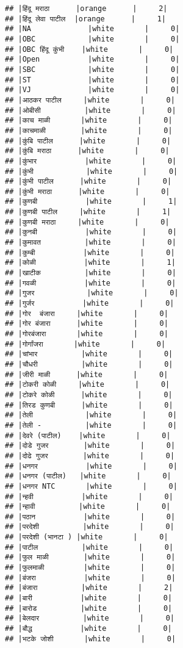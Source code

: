 \documentclass[
]{article}
\begin{document}
\begin{verbatim}
## |हिंदू मराठा      |orange      |     2|
## |हिंदू लेवा पाटील  |orange      |     1|
## |NA             |white       |     0|
## |OBC            |white       |     0|
## |OBC हिंदू कुंभी    |white       |     0|
## |Open           |white       |     0|
## |SBC            |white       |     0|
## |ST             |white       |     0|
## |VJ             |white       |     0|
## |आठकर पाटील     |white       |     0|
## |ओबीसी          |white       |     0|
## |काच माळी       |white       |     0|
## |काचमाळी        |white       |     0|
## |कुंबि पाटील      |white       |     0|
## |कुंबि मराठा      |white       |     0|
## |कुंभार           |white       |     0|
## |कुंभी            |white       |     0|
## |कुंभी पाटील      |white       |     0|
## |कुंभी मराठा      |white       |     0|
## |कुणबी           |white       |     1|
## |कुणबी पाटील     |white       |     1|
## |कुणबी मराठा     |white       |     0|
## |कुनबी           |white       |     0|
## |कुमावत          |white       |     0|
## |कुम्बी           |white       |     0|
## |कोळी           |white       |     1|
## |खाटीक          |white       |     0|
## |गवळी           |white       |     0|
## |गुजर            |white       |     0|
## |गुर्जर           |white       |     0|
## |गोर  बंजारा     |white       |     0|
## |गोर बंजारा      |white       |     0|
## |गोरबंजारा       |white       |     0|
## |गोर्गांजरा       |white       |     0|
## |चांभार          |white       |     0|
## |चौधरी          |white       |     0|
## |जीरी माळी      |white       |     0|
## |टोकरी कोळी     |white       |     0|
## |टोकरे कोळी      |white       |     0|
## |तिरड कुणबी      |white       |     0|
## |तेली            |white       |     0|
## |तेली -          |white       |     0|
## |देवरे (पाटील)    |white       |     0|
## |दोडे गुजर        |white       |     0|
## |दोढे गुजर        |white       |     0|
## |धनगर           |white       |     0|
## |धनगर (पाटील)   |white       |     0|
## |धनगर NTC       |white       |     0|
## |न्हवी           |white       |     0|
## |न्हावी          |white       |     0|
## |पठान           |white       |     0|
## |परदेशी          |white       |     0|
## |परदेशी (भानटा ) |white       |     0|
## |पाटील          |white       |     0|
## |फुल माळी        |white       |     0|
## |फुलमाळी         |white       |     0|
## |बंजरा           |white       |     0|
## |बंजारा          |white       |     2|
## |बारी           |white       |     0|
## |बारोड          |white       |     0|
## |बेलदार          |white       |     0|
## |बौद्ध           |white       |     0|
## |भटके जोशी       |white       |     0|

\end{verbatim}
\end{document}
